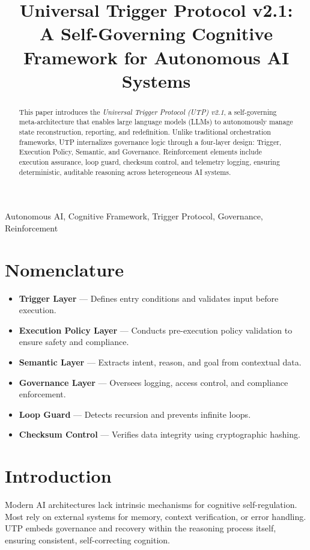 \documentclass[conference]{IEEEtran}
\title{
Universal Trigger Protocol v2.1: \\
A Self-Governing Cognitive Framework for Autonomous AI Systems
}
\author{
\IEEEauthorblockN{Seigo Kato}
\IEEEauthorblockA{
G-ACE.inc / Libral Core Project \\
Email: seigo@g-ace.inc
}
}
\begin{document}
\maketitle

\begin{abstract}
This paper introduces the \textit{Universal Trigger Protocol (UTP) v2.1}, a self-governing meta-architecture that enables large language models (LLMs) to autonomously manage state reconstruction, reporting, and redefinition.
Unlike traditional orchestration frameworks, UTP internalizes governance logic through a four-layer design: Trigger, Execution Policy, Semantic, and Governance.
Reinforcement elements include execution assurance, loop guard, checksum control, and telemetry logging, ensuring deterministic, auditable reasoning across heterogeneous AI systems.
\end{abstract}

\begin{IEEEkeywords}
Autonomous AI, Cognitive Framework, Trigger Protocol, Governance, Reinforcement
\end{IEEEkeywords}

\section*{Nomenclature}
\begin{itemize}
\item \textbf{Trigger Layer} — Defines entry conditions and validates input before execution.
\item \textbf{Execution Policy Layer} — Conducts pre-execution policy validation to ensure safety and compliance.
\item \textbf{Semantic Layer} — Extracts intent, reason, and goal from contextual data.
\item \textbf{Governance Layer} — Oversees logging, access control, and compliance enforcement.
\item \textbf{Loop Guard} — Detects recursion and prevents infinite loops.
\item \textbf{Checksum Control} — Verifies data integrity using cryptographic hashing.
\end{itemize}

\section{Introduction}
Modern AI architectures lack intrinsic mechanisms for cognitive self-regulation.
Most rely on external systems for memory, context verification, or error handling.
UTP embeds governance and recovery within the reasoning process itself, ensuring consistent, self-correcting cognition.
\end{document}
